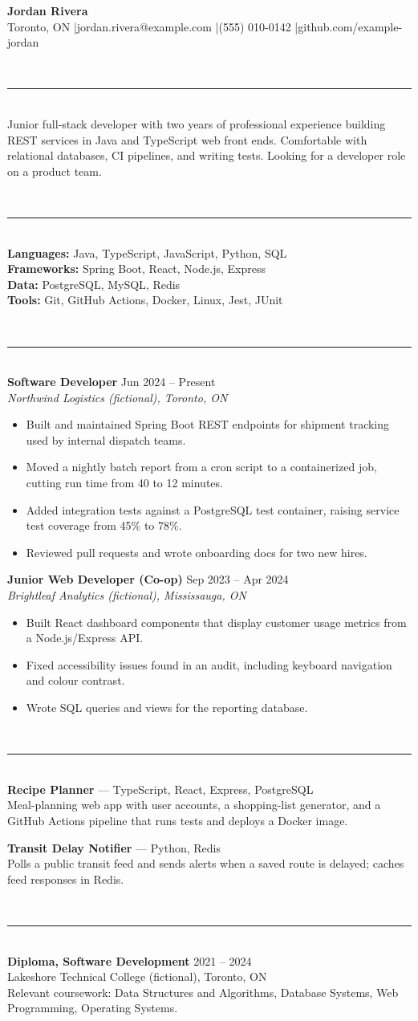 \documentclass[10pt]{article}
\newcommand{\sect}[1]{\vspace{6pt}{\large\bfseries #1}\\[-6pt]\rule{\linewidth}{0.4pt}\\[2pt]}
\newcommand{\role}[3]{\textbf{#1} \hfill #3\\\textit{#2}\\[-4pt]}
\begin{document}
{\LARGE\bfseries Jordan Rivera}\\[2pt]
Toronto, ON \quad|\quad jordan.rivera@example.com \quad|\quad (555) 010-0142 \quad|\quad github.com/example-jordan

\sect{Summary}
Junior full-stack developer with two years of professional experience building REST services in Java and
TypeScript web front ends. Comfortable with relational databases, CI pipelines, and writing tests. Looking
for a developer role on a product team.

\sect{Skills}
\textbf{Languages:} Java, TypeScript, JavaScript, Python, SQL\\
\textbf{Frameworks:} Spring Boot, React, Node.js, Express\\
\textbf{Data:} PostgreSQL, MySQL, Redis\\
\textbf{Tools:} Git, GitHub Actions, Docker, Linux, Jest, JUnit

\sect{Experience}
\role{Software Developer}{Northwind Logistics (fictional), Toronto, ON}{Jun 2024 -- Present}
\begin{itemize}
  \item Built and maintained Spring Boot REST endpoints for shipment tracking used by internal dispatch teams.
  \item Moved a nightly batch report from a cron script to a containerized job, cutting run time from 40 to 12 minutes.
  \item Added integration tests against a PostgreSQL test container, raising service test coverage from 45\% to 78\%.
  \item Reviewed pull requests and wrote onboarding docs for two new hires.
\end{itemize}

\role{Junior Web Developer (Co-op)}{Brightleaf Analytics (fictional), Mississauga, ON}{Sep 2023 -- Apr 2024}
\begin{itemize}
  \item Built React dashboard components that display customer usage metrics from a Node.js/Express API.
  \item Fixed accessibility issues found in an audit, including keyboard navigation and colour contrast.
  \item Wrote SQL queries and views for the reporting database.
\end{itemize}

\sect{Projects}
\textbf{Recipe Planner} --- TypeScript, React, Express, PostgreSQL\\
Meal-planning web app with user accounts, a shopping-list generator, and a GitHub Actions pipeline that runs tests and deploys a Docker image.

\textbf{Transit Delay Notifier} --- Python, Redis\\
Polls a public transit feed and sends alerts when a saved route is delayed; caches feed responses in Redis.

\sect{Education}
\textbf{Diploma, Software Development} \hfill 2021 -- 2024\\
Lakeshore Technical College (fictional), Toronto, ON\\
Relevant coursework: Data Structures and Algorithms, Database Systems, Web Programming, Operating Systems.
\end{document}
